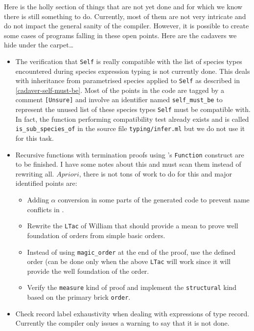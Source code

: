 
Here is the holly section of things that are not yet done and for
which we know there is still something to do. Currently, most of them
are not very intricate and do not impact the general sanity of the
compiler. However, it is possible to create some cases of programs
falling in these open points. Here are the cadavers we hide under the
carpet\ldots\smiley


\begin{itemize}
\item The verification that {\tt Self} is really compatible with the
  list of species types encountered during species expression typing
  is not currently done. This deals with inheritance from parametrised
  species applied to {\tt Self} as described in
  \ref{cadaver-self-must-be}. Most of the points in the code are
  tagged by a comment {\tt [Unsure]} and involve an identifier
  named {\tt self\_must\_be} to represent the unused list of these
  species types {\tt Self} must be compatible with. In fact, the
  function performing compatibility test already exists and is called
  {\tt is\_sub\_species\_of} in the source file {\tt typing/infer.ml}
  but we do not use it for this task.

\item Recursive functions with termination proofs using \coq's
  {\tt Function} construct are to be finished. I have some notes
  about this and must scan them instead of rewriting all. $A
  priori$, there is not tons of work to do for this and major
  identified points are:
  \begin{itemize}
  \item Adding $\alpha$ conversion in some parts of the generated
    code to prevent name conflicts in \coq.
  \item Rewrite the {\tt LTac} of William that should provide a mean
    to prove well foundation of orders from simple basic orders.
  \item Instead of using {\tt magic\_order} at the end of the proof,
    use the defined order (can be done only when the above {\tt LTac}
    will work since it will provide the well foundation of the
    order.
  \item Verify the {\tt measure} kind of proof and implement the
    {\tt structural} kind based on the primary brick {\tt order}.
  \end{itemize}

\item Check record label exhaustivity when dealing with expressions of
  type record. Currently the compiler only issues a warning to say
  that it is not done.
  

\end{itemize}

